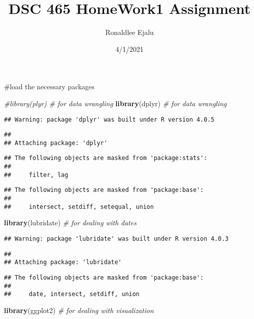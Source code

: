 \documentclass[
]{article}
\title{DSC 465 HomeWork1 Assignment}
\author{Ronaldlee Ejalu}
\date{4/1/2021}
\newenvironment{Shaded}{\begin{snugshade}}{\end{snugshade}}
\newcommand{\CommentTok}[1]{\textcolor[rgb]{0.56,0.35,0.01}{\textit{#1}}}
\newcommand{\KeywordTok}[1]{\textcolor[rgb]{0.13,0.29,0.53}{\textbf{#1}}}
\newcommand{\NormalTok}[1]{#1}
\begin{document}
\maketitle

\#load the necessary packages

\begin{Shaded}
\begin{Highlighting}[]
\CommentTok{#library(plyr) # for data wrangling}
\KeywordTok{library}\NormalTok{(dplyr)     }\CommentTok{# for data wrangling}
\end{Highlighting}
\end{Shaded}

\begin{verbatim}
## Warning: package 'dplyr' was built under R version 4.0.5
\end{verbatim}

\begin{verbatim}
## 
## Attaching package: 'dplyr'
\end{verbatim}

\begin{verbatim}
## The following objects are masked from 'package:stats':
## 
##     filter, lag
\end{verbatim}

\begin{verbatim}
## The following objects are masked from 'package:base':
## 
##     intersect, setdiff, setequal, union
\end{verbatim}

\begin{Shaded}
\begin{Highlighting}[]
\KeywordTok{library}\NormalTok{(lubridate) }\CommentTok{# for dealing with dates}
\end{Highlighting}
\end{Shaded}

\begin{verbatim}
## Warning: package 'lubridate' was built under R version 4.0.3
\end{verbatim}

\begin{verbatim}
## 
## Attaching package: 'lubridate'
\end{verbatim}

\begin{verbatim}
## The following objects are masked from 'package:base':
## 
##     date, intersect, setdiff, union
\end{verbatim}

\begin{Shaded}
\begin{Highlighting}[]
\KeywordTok{library}\NormalTok{(ggplot2)   }\CommentTok{# for dealing with visualization}
\end{Highlighting}
\end{Shaded}
\end{document}
